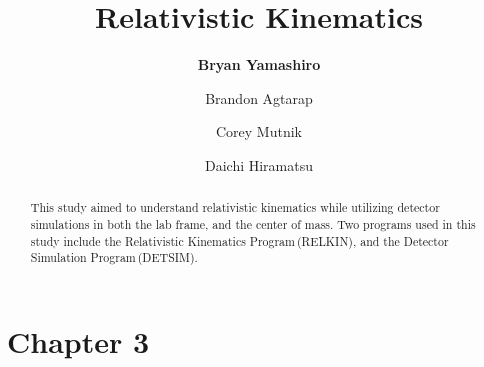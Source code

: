 \documentclass[aps,prl,twocolumn,superscriptaddress,nofootinbib]{revtex4-1}
\begin{document}





\title{Relativistic Kinematics}


\author{\textbf{Bryan Yamashiro}}
\author{Brandon Agtarap}
\author{Corey Mutnik}
\author{Daichi Hiramatsu}






\begin{abstract}

This study aimed to understand relativistic kinematics while utilizing detector simulations in both the lab frame, and the center of mass. Two programs used in this study include the Relativistic Kinematics Program\,(RELKIN), and the Detector Simulation Program\,(DETSIM).



\end{abstract}

\maketitle    %
\section{Chapter 3}
\end{document}
